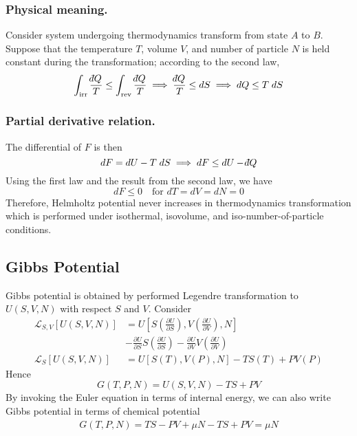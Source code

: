 \documentclass[../../../Main.tex]{subfiles}
\begin{document}
\subsubsection*{Physical meaning.} Consider system undergoing thermodynamics transform from state $A$ to $B$. Suppose that the temperature $T$, volume $V$, and number of particle $N$ is held constant during the transformation; according to the second law,
\begin{equation*}
    \int_\text{irr}\frac{\dbar Q}{T}\leq\int_\text{rev}\frac{\dbar Q}{T} \implies \frac{\dbar Q}{T}\leq d S\implies d Q\leq T\;d S
\end{equation*}
\subsubsection*{Partial derivative relation.} The differential of $F$ is then 
\begin{equation*}
    dF=dU-T\;dS\implies dF\leq dU-\dbar Q
\end{equation*}
Using the first law and the result from the second law, we have
\begin{equation*}
    dF\leq0\quad\text{for }dT=dV=dN=0
\end{equation*} 
Therefore, Helmholtz potential never increases in thermodynamics transformation which is performed under isothermal, isovolume, and iso-number-of-particle conditions.

\subsection*{Gibbs Potential}
Gibbs potential is obtained by performed Legendre transformation to $U(S,V,N)$ with respect $S$ and $V$. Consider
\begin{align*}
    \mathcal{L}_{S,V}[U(S,V,N)]&=U\left[S\left(\frac{\partial U}{\partial S}\right), V\left(\frac{\partial U}{\partial V}\right),N\right]\\
    &-\frac{\partial U}{\partial S}S\left(\frac{\partial U}{\partial S}\right) - \frac{\partial U}{\partial V}V\left(\frac{\partial U}{\partial V}\right)\\
    \mathcal{L}_S[U(S,V,N)]&=U[S(T),V(P),N]-TS(T)+PV(P)
\end{align*}
Hence
\begin{equation*}
    G(T,P,N)=U(S,V,N)-TS+PV
\end{equation*}
By invoking the Euler equation in terms of internal energy, we can also write Gibbs potential in terms of chemical potential 
\begin{align*}
    G(T,P,N)=TS-PV+\mu N-TS+PV=\mu N
\end{align*}
\end{document}
